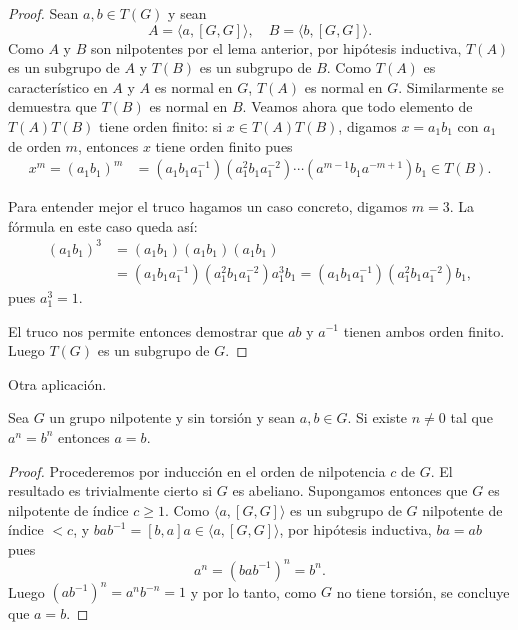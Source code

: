 \begin{proof}
	Sean $a,b\in T(G)$ y sean
	\[
		A=\langle a,[G,G]\rangle,\quad
		B=\langle b,[G,G]\rangle.
	\]
	Como $A$ y $B$ son nilpotentes por el lema anterior, por hipótesis
	inductiva, $T(A)$ es un subgrupo de $A$ y $T(B)$ es un subgrupo de $B$.
	Como $T(A)$ es característico en $A$ y $A$ es normal en $G$, $T(A)$ es
	normal en $G$. Similarmente se demuestra que $T(B)$ es normal en $B$.  
	Veamos ahora que todo elemento de $T(A)T(B)$ tiene orden finito: si
	$x\in T(A)T(B)$, digamos $x=a_1b_1$ con
	$a_1$ de orden $m$, entonces $x$ tiene orden finito pues 
	\begin{align*}
	x^m=(a_1b_1)^m&=%
	(a_1b_1a_1^{-1})(a_1^2b_1a_1^{-2})\cdots (a^{m-1} b_1 a^{-m+1})b_1\in T(B).
	\end{align*}
	
	Para entender mejor el truco hagamos un caso concreto, digamos $m=3$. La fórmula en este caso queda así:
	\begin{align*}
	(a_1b_1)^3&=(a_1b_1)(a_1b_1)(a_1b_1)\\
	&=(a_1b_1a_1^{-1})(a_1^2b_1a_1^{-2})a_1^3b_1
	=(a_1b_1a_1^{-1})(a_1^2b_1a_1^{-2})b_1,
	\end{align*}
	pues $a_1^3=1$.
	
	El truco nos permite entonces demostrar que $ab$ y $a^{-1}$ tienen ambos 
	orden finito. Luego $T(G)$ es un
	subgrupo de $G$.
\end{proof}

Otra aplicación.

\begin{theorem}
	\label{theorem:a=b}
	Sea $G$ un grupo nilpotente y sin torsión y sean $a,b\in G$. Si existe
	$n\ne 0$ tal que $a^n=b^n$ entonces $a=b$.
\end{theorem}

\begin{proof}
	Procederemos por inducción en el orden de nilpotencia $c$ de $G$. El
	resultado es trivialmente cierto si $G$ es abeliano. Supongamos entonces
	que $G$ es nilpotente de índice $c\geq1$. Como $\langle a,[G,G]\rangle$ es un
	subgrupo de $G$ nilpotente de índice $<c$, y $bab^{-1}=[b,a]a\in \langle
	a,[G,G]\rangle$, por hipótesis inductiva, $ba=ab$ pues 
	\[
		a^n=(bab^{-1})^n=b^n.
	\]
	Luego $(ab^{-1})^n=a^nb^{-n}=1$ y por lo tanto, como $G$ no tiene torsión,
	se concluye que $a=b$.
\end{proof}

